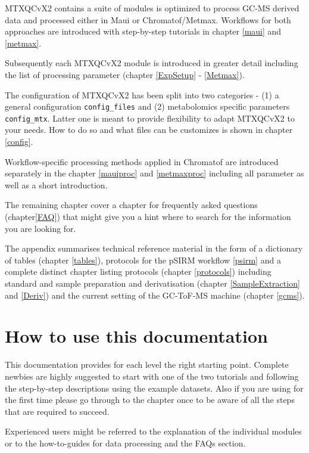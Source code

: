 \documentclass[]{book}
\theoremstyle{definition}
\theoremstyle{definition}
\theoremstyle{definition}
\theoremstyle{remark}
\begin{document}
MTXQCvX2 contains a suite of modules is optimized to process GC-MS
derived data and processed either in Maui or Chromatof/Metmax. Workflows
for both approaches are introduced with step-by-step tutorials in
chapter \ref{maui} and \ref{metmax}.

Subsequently each MTXQCvX2 module is introduced in greater detail
including the list of processing parameter (chapter \ref{ExpSetup} -
\ref{Metmax}).

The configuration of MTXQCvX2 has been split into two categories - (1) a
general configuration \texttt{config\_files} and (2) metabolomics
specific parameters \texttt{config\_mtx}. Latter one is meant to provide
flexibility to adapt MTXQCvX2 to your needs. How to do so and what files
can be customizes is shown in chapter \ref{config}.

Workflow-specific processing methods applied in Chromatof are introduced
separately in the chapter \ref{mauiproc} and \ref{metmaxproc} including
all parameter as well as a short introduction.

The remaining chapter cover a chapter for frequently asked questions
(chapter\ref{FAQ}) that might give you a hint where to search for the
information you are looking for.

The appendix summarises technical reference material in the form of a
dictionary of tables (chapter \ref{tables}), protocols for the pSIRM
workflow \ref{psirm} and a complete distinct chapter listing protocols
(chapter \ref{protocols}) including standard and sample preparation and
derivatisation (chapter \ref{SampleExtraction} and \ref{Deriv}) and the
current setting of the GC-ToF-MS machine (chapter \ref{gcms}).

\section{How to use this
documentation}\label{how-to-use-this-documentation}

This documentation provides for each level the right starting point.
Complete newbies are highly suggested to start with one of the two
tutorials and following the step-by-step descriptions using the example
datasets. Also if you are using for the first time please go through to
the chapter once to be aware of all the steps that are required to
succeed.

Experienced users might be referred to the explanation of the individual
modules or to the how-to-guides for data processing and the FAQs
section.
\end{document}
